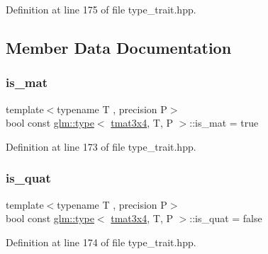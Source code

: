 Definition at line 175 of file type\+\_\+trait.\+hpp.



\subsection{Member Data Documentation}
\mbox{\label{structglm_1_1type_3_01tmat3x4_00_01_t_00_01_p_01_4_a352d4feea2dff7acf213b9caf1a80ff2}} 
\subsubsection{\texorpdfstring{is\_mat}{is\_mat}}
{\footnotesize\ttfamily template$<$typename T , precision P$>$ \\
bool const \mbox{\hyperlink{structglm_1_1type}{glm\+::type}}$<$ \mbox{\hyperlink{structglm_1_1tmat3x4}{tmat3x4}}, T, P $>$\+::is\+\_\+mat = true\hspace{0.3cm}{\ttfamily [static]}}



Definition at line 173 of file type\+\_\+trait.\+hpp.

\mbox{\label{structglm_1_1type_3_01tmat3x4_00_01_t_00_01_p_01_4_a29f350bebcffa210f4cf19fadce9093f}} 
\subsubsection{\texorpdfstring{is\_quat}{is\_quat}}
{\footnotesize\ttfamily template$<$typename T , precision P$>$ \\
bool const \mbox{\hyperlink{structglm_1_1type}{glm\+::type}}$<$ \mbox{\hyperlink{structglm_1_1tmat3x4}{tmat3x4}}, T, P $>$\+::is\+\_\+quat = false\hspace{0.3cm}{\ttfamily [static]}}



Definition at line 174 of file type\+\_\+trait.\+hpp.

\mbox{\label{structglm_1_1type_3_01tmat3x4_00_01_t_00_01_p_01_4_a0f8889ba1c42a20724de490aedd7869b}} 
